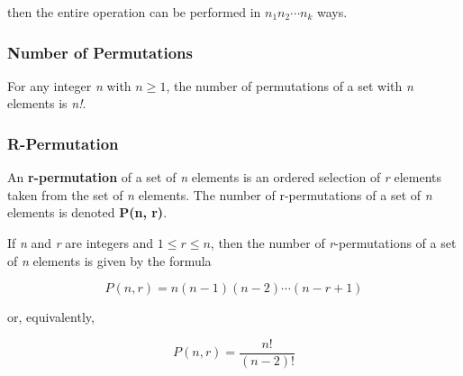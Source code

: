 \documentclass{article}
\begin{document}
then the entire operation can be performed in $n_1 n_2 \cdots n_k$ ways.

\subsubsection{Number of Permutations}
For any integer \textit{n} with $n \geq 1$, the number of permutations of a set with \textit{n} elements is \textit{n!}.

\subsubsection{R-Permutation}
An \textbf{r-permutation} of a set of \textit{n} elements is an ordered selection of \textit{r} elements taken from the set of \textit{n} elements. The number of r-permutations of a set of \textit{n} elements is denoted \textbf{P(n, r)}.

If \textit{n} and \textit{r} are integers and $1 \leq r \leq n$, then the number of \textit{r}-permutations of a set of \textit{n} elements is given by the formula

\begin{equation*}
P(n, r) = n(n - 1)(n - 2) \cdots (n - r + 1)
\end{equation*}

or, equivalently,

\begin{equation*}
P(n, r) = \frac{n!}{(n - 2)!}
\end{equation*}
\end{document}
